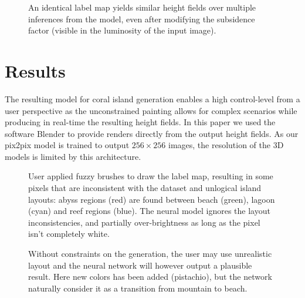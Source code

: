 \begin{figure}[t]
    \caption{An identical label map yields similar height fields over multiple inferences from the model, even after modifying the subsidence factor (visible in the luminosity of the input image).}
    \label{fig:coral-island_results-subsidence}
\end{figure}
\section{Results}
\label{sec:coral-island_results}

The resulting model for coral island generation enables a high control-level from a user perspective as the unconstrained painting allows for complex scenarios while producing in real-time the resulting height fields. In this paper we used the software Blender to provide renders directly from the output height fields. As our pix2pix model is trained to output $256\times256$ images, the resolution of the 3D models is limited by this architecture.

\begin{figure}[t]
    \caption{User applied fuzzy brushes to draw the label map, resulting in some pixels that are inconsistent with the dataset and unlogical island layouts: abyss regions (red) are found between beach (green), lagoon (cyan) and reef regions (blue). The neural model ignores the layout inconsistencies, and partially over-brightness as long as the pixel isn't completely white. }
    \label{fig:coral-island_results-fuzzy}
\end{figure}
\begin{figure}[b]
    \caption{Without constraints on the generation, the user may use unrealistic layout and the neural network will however output a plausible result. Here new colors has been added (pistachio), but the network naturally consider it as a transition from mountain to beach. }
    \label{fig:coral-island_results_dino}
\end{figure}

